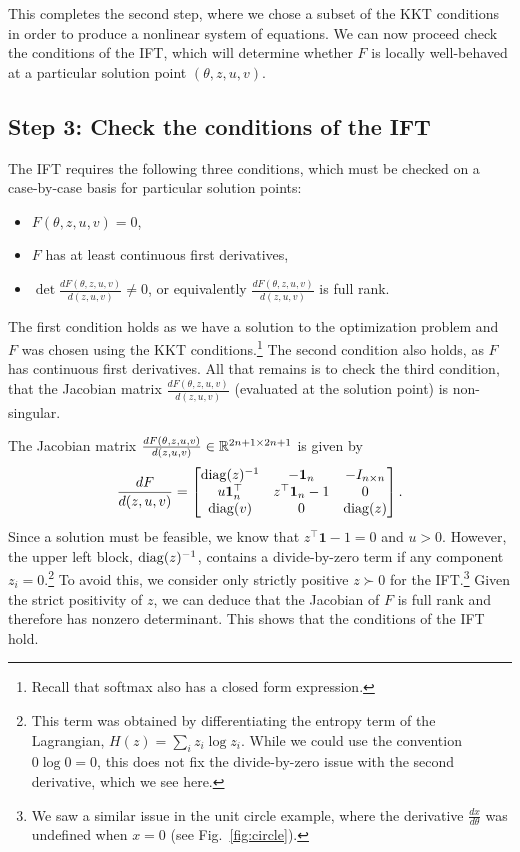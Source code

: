 \documentclass[11pt]{article}
\begin{document}
This completes the second step, where we chose a subset of the KKT conditions
in order to produce a nonlinear system of equations.
We can now proceed check the conditions of the IFT,
which will determine whether $F$ is locally well-behaved
at a particular solution point $(\theta, z,u,v)$.

\subsection*{Step 3: Check the conditions of the IFT}
The IFT requires the following three conditions,
which must be checked on a case-by-case basis for particular
solution points:
\begin{itemize}
    \item $F(\theta,z,u,v) = 0$,
    \item $F$ has at least continuous first derivatives,
    \item $\det\frac{dF(\theta,z,u,v)}{d(z,u,v)} \ne 0$,
        or equivalently $\frac{dF(\theta,z,u,v)}{d(z,u,v)}$
        is full rank.
\end{itemize}
The first condition holds as we have a solution to the optimization problem
and $F$ was chosen using the KKT conditions.\footnote{
Recall that softmax also has a closed form expression.}
The second condition also holds, as $F$ has continuous first derivatives.
All that remains is to check the third condition,
that the Jacobian matrix $\frac{dF(\theta,z,u,v)}{d(z,u,v)}$
(evaluated at the solution point) is non-singular.

The Jacobian matrix $\frac{dF(\theta,z,u,v)}{d(z,u,v)}\in\mathbb{R}^{2n+1\times 2n+1}$ is given by
\begin{equation}
\label{eqn:f-jac}
\frac{dF}{d(z,u,v)}=
\begin{bmatrix}
\mathrm{diag}(z)^{-1} & -\mathbf{1}_n & -I_{n\times n} \\
u\mathbf{1}_n^\top & z^\top\mathbf{1}_n - 1 & 0\\
\mathrm{diag}(v) & 0 & \mathrm{diag}(z)
\end{bmatrix}.
\end{equation}
Since a solution must be feasible, we know that $z^\top\mathbf{1}-1=0$ and $u > 0$.
However, the upper left block, $\mathrm{diag}(z)^{-1}$, contains a divide-by-zero term if
any component $z_i = 0$.\footnote{
This term was obtained by differentiating the entropy
term of the Lagrangian, $H(z) = \sum_i z_i\log z_i$.
While we could use the convention $0\log 0 = 0$,
this does not fix the divide-by-zero issue with the second derivative, which we see here.
}
To avoid this, we consider only strictly positive $z \succ 0$ for the IFT.\footnote{
We saw a similar issue in the unit circle example, where the derivative
$\frac{dx}{d\theta}$ was undefined when $x=0$ (see Fig.~\ref{fig:circle}).
}
Given the strict positivity of $z$,
we can deduce that the Jacobian of $F$ is full rank and therefore has nonzero determinant.
This shows that the conditions of the IFT hold.
\end{document}
